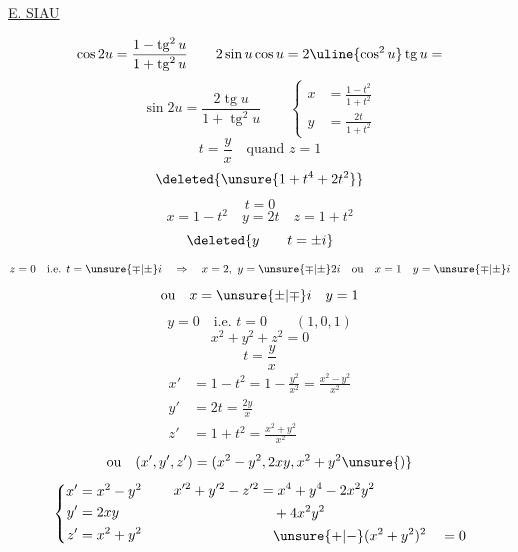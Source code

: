 
\uline{E. SIAU}

\[
\cos 2u=\frac{1-\operatorname{tg}^2u}{1+\operatorname{tg}^2u}
\qquad
2\sin u\cos u=2\uline{\cos^2u}\operatorname{tg}u=
\]
\[
\sin 2u=\frac{2\operatorname{tg}u}{1+\operatorname{tg}^2u}
\qquad
\left\{\begin{aligned}
x&=\frac{1-t^2}{1+t^2}\\
y&=\frac{2t}{1+t^2}
\end{aligned}\right.
\]
\[t=\frac yx\quad\text{quand }z=1\]
\[\deleted{\unsure{1+t^4+2t^2}}\]
\[t=0\]
\[x=1-t^2\quad y=2t\quad z=1+t^2\]
\[\deleted{y\qquad t=\pm i}\]
\[
z=0\quad\text{i.e. }t=\unsure{\mp|\pm}i\quad\Rightarrow\quad x=2,\ y=\unsure{\mp|\pm}2i
\quad\text{ou}\quad x=1\quad y=\unsure{\mp|\pm}i
\]
\[\text{ou}\quad x=\unsure{\pm|\mp}i\quad y=1\]
\[y=0\quad\text{i.e. }t=0\qquad(1,0,1)\]
\[
x^2+y^2+z^2=0
\]
\[t=\frac yx\]
\[
\begin{aligned}
x'&=1-t^2=1-\frac{y^2}{x^2}=\frac{x^2-y^2}{x^2}\\
y'&=2t=\frac{2y}{x}\\
z'&=1+t^2=\frac{x^2+y^2}{x^2}
\end{aligned}
\]
\[\text{ou}\quad (x',y',z')=(x^2-y^2,2xy,x^2+y^2\unsure{)}\]
\[
\left\{\begin{aligned}
x'&=x^2-y^2\\
y'&=2xy\\
z'&=x^2+y^2
\end{aligned}\right.
\qquad
\begin{aligned}
x'^2+y'^2-z'^2&=x^4+y^4-2x^2y^2\\
&\quad+4x^2y^2\\
&\quad\unsure{+|-}(x^2+y^2)^2\quad=0
\end{aligned}
\]
